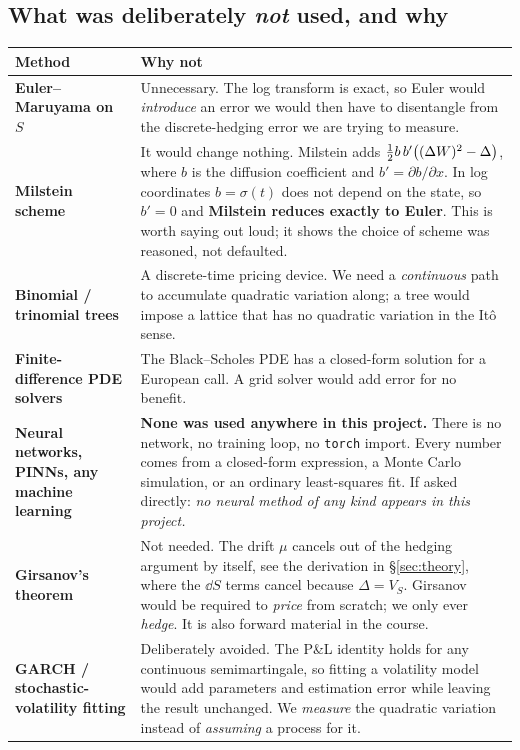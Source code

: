 \documentclass[11pt,a4paper]{article}
\begin{document}
\subsection{What was deliberately \emph{not} used, and why}

\begin{table}[H]
\centering\small
\begin{tabular}{L{3.6cm}L{11.6cm}}
\toprule
\textbf{Method} & \textbf{Why not} \\
\midrule
\textbf{Euler--Maruyama on $S$} & Unnecessary. The log transform is exact, so Euler would
\emph{introduce} an error we would then have to disentangle from the discrete-hedging error we
are trying to measure. \\
\addlinespace
\textbf{Milstein scheme} & It would change nothing. Milstein adds
$\tfrac{1}{2} b\,b'\big((\Delta W)^2-\Delta\big)$, where $b$ is the diffusion coefficient and
$b'=\partial b/\partial x$. In log coordinates $b=\sigma(t)$ does not depend on the state, so
$b'=0$ and \textbf{Milstein reduces exactly to Euler}. This is worth saying out loud; it
shows the choice of scheme was reasoned, not defaulted. \\
\addlinespace
\textbf{Binomial / trinomial trees} & A discrete-time pricing device. We need a
\emph{continuous} path to accumulate quadratic variation along; a tree would impose a lattice
that has no quadratic variation in the It\^o sense. \\
\addlinespace
\textbf{Finite-difference PDE solvers} & The Black--Scholes PDE has a closed-form solution for
a European call. A grid solver would add error for no benefit. \\
\addlinespace
\textbf{Neural networks, PINNs, any machine learning} & \textbf{None was used anywhere in this
project.} There is no network, no training loop, no \texttt{torch} import. Every number comes
from a closed-form expression, a Monte Carlo simulation, or an ordinary least-squares fit. If
asked directly: \emph{no neural method of any kind appears in this project.} \\
\addlinespace
\textbf{Girsanov's theorem} & Not needed. The drift $\mu$ cancels out of the hedging argument
by itself, see the derivation in \S\ref{sec:theory}, where the $\dd S$ terms cancel because
$\Delta=V_S$. Girsanov would be required to \emph{price} from scratch; we only ever
\emph{hedge}. It is also forward material in the course. \\
\addlinespace
\textbf{GARCH / stochastic-volatility fitting} & Deliberately avoided. The P\&L identity holds
for any continuous semimartingale, so fitting a volatility model would add parameters and
estimation error while leaving the result unchanged. We \emph{measure} the quadratic variation
instead of \emph{assuming} a process for it. \\
\bottomrule
\end{tabular}
\end{table}
\end{document}
